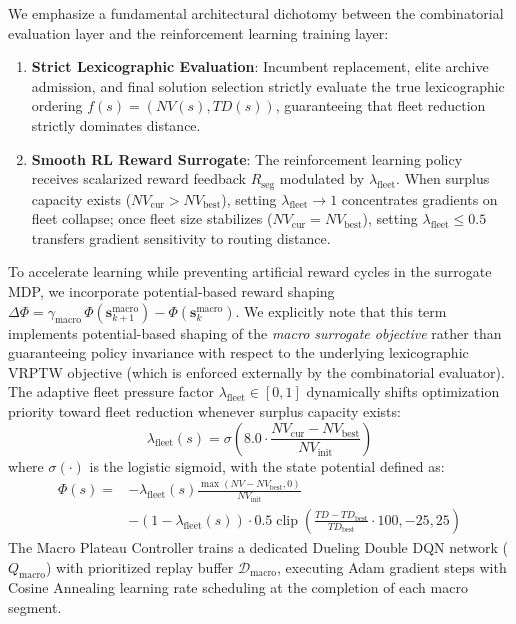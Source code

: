 \documentclass{ieeeaccess}
\begin{document}
We emphasize a fundamental architectural dichotomy between the combinatorial evaluation layer and the reinforcement learning training layer:
\begin{enumerate}
    \item \textbf{Strict Lexicographic Evaluation}: Incumbent replacement, elite archive admission, and final solution selection strictly evaluate the true lexicographic ordering $f(s) = (NV(s), TD(s))$, guaranteeing that fleet reduction strictly dominates distance.
    \item \textbf{Smooth RL Reward Surrogate}: The reinforcement learning policy receives scalarized reward feedback $R_{\text{seg}}$ modulated by $\lambda_{\text{fleet}}$. When surplus capacity exists ($NV_{\text{cur}} > NV_{\text{best}}$), setting $\lambda_{\text{fleet}} \to 1$ concentrates gradients on fleet collapse; once fleet size stabilizes ($NV_{\text{cur}} = NV_{\text{best}}$), setting $\lambda_{\text{fleet}} \le 0.5$ transfers gradient sensitivity to routing distance.
\end{enumerate}

To accelerate learning while preventing artificial reward cycles in the surrogate MDP, we incorporate potential-based reward shaping $\Delta \Phi = \gamma_{\text{macro}}\,\Phi(\mathbf{s}_{k+1}^{\text{macro}}) - \Phi(\mathbf{s}_k^{\text{macro}})$. We explicitly note that this term implements potential-based shaping of the \emph{macro surrogate objective} \cite{ng1999policy} rather than guaranteeing policy invariance with respect to the underlying lexicographic VRPTW objective (which is enforced externally by the combinatorial evaluator). The adaptive fleet pressure factor $\lambda_{\text{fleet}} \in [0, 1]$ dynamically shifts optimization priority toward fleet reduction whenever surplus capacity exists:
\begin{equation}
  \lambda_{\text{fleet}}(s) = \sigma\!\left(8.0 \cdot \frac{NV_{\text{cur}} - NV_{\text{best}}}{NV_{\text{init}}}\right)
  \label{eq:lambda_fleet}
\end{equation}
where $\sigma(\cdot)$ is the logistic sigmoid, with the state potential defined as:
\begin{align}
  \Phi(s) = &-\lambda_{\text{fleet}}(s) \frac{\max(NV - NV_{\text{best}}, 0)}{NV_{\text{init}}} \nonumber \\
  &- (1 - \lambda_{\text{fleet}}(s)) \cdot 0.5 \operatorname{clip}\!\left(\frac{TD - TD_{\text{best}}}{TD_{\text{best}}} \cdot 100, -25, 25\right)
  \label{eq:potential_function}
\end{align}
The Macro Plateau Controller trains a dedicated Dueling Double DQN network ($Q_{\text{macro}}$) with prioritized replay buffer $\mathcal{D}_{\text{macro}}$, executing Adam gradient steps with Cosine Annealing learning rate scheduling at the completion of each macro segment.
\end{document}
